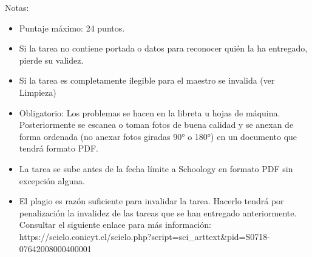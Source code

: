 \documentclass[11pt,article,landscape]{memoir}
\begin{document}
Notas:\\
\begin{itemize}
    \item Puntaje máximo: 24 puntos.
    \item Si la tarea no contiene portada o datos para reconocer quién la ha entregado, pierde su validez.
    \item Si la tarea es completamente ilegible para el maestro se invalida (ver Limpieza)
    \item Obligatorio: Los problemas se hacen en la libreta u hojas de máquina. Posteriormente se escanea o toman fotos de buena calidad y se anexan de forma ordenada (no anexar fotos giradas 90° o 180°) en un documento que tendrá formato PDF.
    \item La tarea se sube antes de la fecha límite a Schoology en formato PDF sin excepción alguna.
    \item El plagio es razón suficiente para invalidar la tarea. Hacerlo tendrá por penalización la invalidez de las tareas que se han entregado anteriormente. Consultar el siguiente enlace para más información: https://scielo.conicyt.cl/scielo.php?script=sci\_arttext\&pid=S0718-07642008000400001
\end{itemize}
\end{document}
